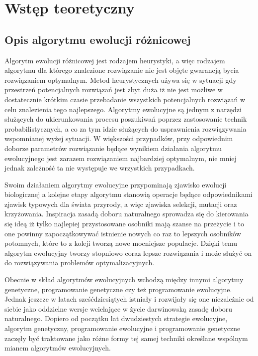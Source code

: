 \chapter{Wstęp teoretyczny}\label{cha:pierwszyDokument}


\section{Opis algorytmu ewolucji różnicowej}\label{sec:strukturaDokumentu}


Algorytm ewolucji różnicowej jest rodzajem heurystyki, a więc rodzajem algorytmu dla którego znalezione rozwiązanie nie jest objęte gwarancją bycia rozwiązaniem optymalnym. Metod heurystycznych używa się w sytuacji gdy przestrzeń potencjalnych rozwiązań jest zbyt duża iż nie jest możliwe w dostatecznie krótkim czasie przebadanie wszystkich  potencjalnych rozwiązań w celu znalezienia tego najlepszego. Algorytmy ewolucyjne są jednym z narzędzi służących do ukierunkowania procesu poszukiwań poprzez zastosowanie technik probabilistycznych, a co za tym idzie służących do usprawnienia rozwiązywania wspomnianej wyżej sytuacji. W większości przypadków, przy odpowiednim doborze parametrów rozwiązanie będące wynikiem działania algorytmu ewolucyjnego jest zarazem rozwiązaniem najbardziej optymalnym, nie mniej jednak zależność ta nie występuje  we wrzystkich przypadkach.

Swoim działaniem algorytmy ewolucyjne przypominają zjawisko ewolucji biologicznej a kolejne etapy algorytmu stanowią operacje będące odpowiednikami zjawisk typowych dla świata przyrody, a więc zjawiska selekcji, mutacji oraz krzyżowania. Inspiracja zasadą doboru naturalnego sprowadza się do  kierowania się ideą iż tylko najlepiej przystosowane osobniki mają szanse na przeżycie i to one powinny zapoczątkowywać istnienie nowych co raz to lepszych osobników potomnych, które to z koleji tworzą nowe mocniejsze populacje. Dzięki temu algorytm ewolucyjny tworzy stopniowo coraz lepsze rozwiązania i może służyć on do rozwiązywania problemów optymalizacyjnych.

Obecnie w skład algorytmów ewolucyjnych wchodzą między innymi algorytmy genetyczne, programowanie genetyczne czy też programowanie ewolucyjne. Jednak jeszcze w latach sześćdziesiątych istniały i rozwijały się one niezależnie od siebie jako oddzielne wersje wcielające w życie darwinowską zasadę doboru naturalnego. Dopiero od początku lat dwudziestych strategie ewolucyjne, algorytm genetyczny, programowanie ewolucyjne i programowanie genetyczne zaczęły być traktowane jako różne formy tej samej techniki określane wspólnym mianem algorytmów ewolucyjnych.

